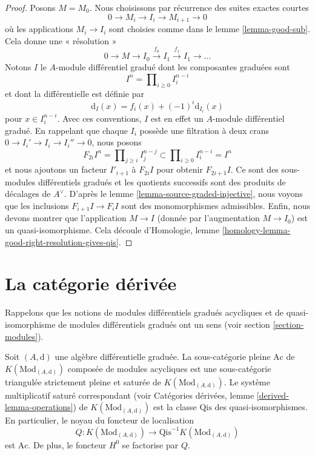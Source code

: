 \begin{proof}
Posons $M = M_0$. Nous choisissons par récurrence des suites exactes courtes
$$
0 \to M_i \to I_i \to M_{i + 1} \to 0
$$
où les applications $M_i \to I_i$ sont choisies comme dans le lemme
\ref{lemma-good-sub}. Cela donne une « résolution »
$$
0 \to M \to I_0 \xrightarrow{f_0} I_1 \xrightarrow{f_1} I_1 \to \ldots
$$
Notons $I$ le $A$-module différentiel gradué dont les composantes graduées sont
$$
I^n = \prod\nolimits_{i \geq 0} I^{n - i}_i
$$
et dont la différentielle est définie par
$$
\text{d}_I(x) = f_i(x) + (-1)^i \text{d}_{I_i}(x)
$$
pour $x \in I_i^{n - i}$. Avec ces conventions, $I$ est en effet un $A$-module
différentiel gradué. En rappelant que chaque $I_i$ possède une filtration à deux crans
$0 \to I_i' \to I_i \to I_i'' \to 0$, nous posons
$$
F_{2i}I^n = \prod\nolimits_{j \geq i} I^{n - j}_j
\subset
\prod\nolimits_{i \geq 0} I^{n - i}_i = I^n
$$
et nous ajoutons un facteur $I'_{i + 1}$ à $F_{2i}I$ pour obtenir $F_{2i +
1}I$. Ce sont des sous-modules différentiels gradués et les quotients
successifs sont des produits de décalages de
$A^\vee$. D'après le lemme \ref{lemma-source-graded-injective}, nous
voyons que les inclusions $F_{i + 1}I \to F_iI$ sont des monomorphismes
admissibles. Enfin, nous devons montrer que l'application $M \to I$
(donnée par l'augmentation $M \to I_0$) est un quasi-isomorphisme. Cela découle
d'Homologie, lemme \ref{homology-lemma-good-right-resolution-gives-qis}.
\end{proof}






\section{La catégorie dérivée}
\label{section-derived}

\noindent
Rappelons que les notions de modules différentiels gradués
acycliques et de quasi-isomorphisme de modules différentiels gradués ont un
sens (voir section \ref{section-modules}).

\begin{lemma}
\label{lemma-acyclic}
Soit $(A, \text{d})$ une algèbre différentielle
graduée. La sous-catégorie pleine $\text{Ac}$ de $K(\text{Mod}_{(A,
\text{d})})$ composée de modules acycliques est une sous-catégorie triangulée
strictement pleine et saturée de $K(\text{Mod}_{(A,
\text{d})})$. Le système multiplicatif saturé correspondant
(voir Catégories dérivées, lemme \ref{derived-lemma-operations})
de $K(\text{Mod}_{(A, \text{d})})$ est la classe $\text{Qis}$ des
quasi-isomorphismes. En particulier, le noyau du foncteur de
localisation
$$
Q : K(\text{Mod}_{(A, \text{d})}) \to
\text{Qis}^{-1}K(\text{Mod}_{(A, \text{d})})
$$
est $\text{Ac}$. De plus, le foncteur $H^0$ se factorise par $Q$.
\end{lemma}

